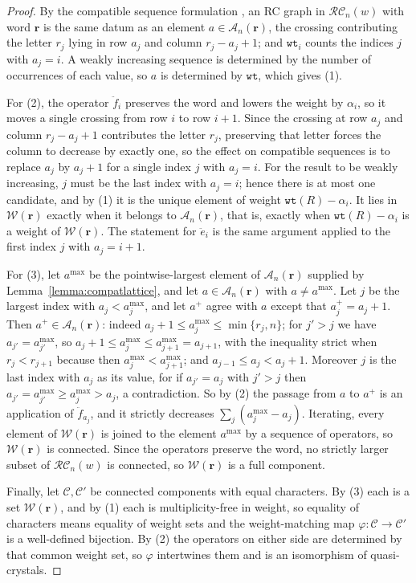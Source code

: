 \documentclass{amsart}
\theoremstyle{definition}
\theoremstyle{remark}
\numberwithin{equation}{subsection}
\newcommand{\wtt}{\mathtt{wt}}
\newcommand{\RC}{\mathcal{RC}}
\begin{document}
\begin{proof}
By the compatible sequence formulation \cite{bjs}, an RC graph in $\RC_n(w)$ with word $\mathbf{r}$ is the same datum as an element $a\in\mathcal{A}_n(\mathbf{r})$, the crossing contributing the letter $r_j$ lying in row $a_j$ and column $r_j-a_j+1$; and $\wtt_i$ counts the indices $j$ with $a_j=i$. A weakly increasing sequence is determined by the number of occurrences of each value, so $a$ is determined by $\wtt$, which gives (1).

For (2), the operator $\ddot{f}_i$ preserves the word and lowers the weight by $\alpha_i$, so it moves a single crossing from row $i$ to row $i+1$. Since the crossing at row $a_j$ and column $r_j-a_j+1$ contributes the letter $r_j$, preserving that letter forces the column to decrease by exactly one, so the effect on compatible sequences is to replace $a_j$ by $a_j+1$ for a single index $j$ with $a_j=i$. For the result to be weakly increasing, $j$ must be the last index with $a_j=i$; hence there is at most one candidate, and by (1) it is the unique element of weight $\wtt(R)-\alpha_i$. It lies in $\mathcal{W}(\mathbf{r})$ exactly when it belongs to $\mathcal{A}_n(\mathbf{r})$, that is, exactly when $\wtt(R)-\alpha_i$ is a weight of $\mathcal{W}(\mathbf{r})$. The statement for $\ddot{e}_i$ is the same argument applied to the first index $j$ with $a_j=i+1$.

For (3), let $a^{\max}$ be the pointwise-largest element of $\mathcal{A}_n(\mathbf{r})$ supplied by Lemma~\ref{lemma:compatlattice}, and let $a\in\mathcal{A}_n(\mathbf{r})$ with $a\neq a^{\max}$. Let $j$ be the largest index with $a_j<a^{\max}_j$, and let $a^+$ agree with $a$ except that $a^+_j=a_j+1$. Then $a^+\in\mathcal{A}_n(\mathbf{r})$: indeed $a_j+1\leq a^{\max}_j\leq\min\{r_j,n\}$; for $j'>j$ we have $a_{j'}=a^{\max}_{j'}$, so $a_j+1\leq a^{\max}_j\leq a^{\max}_{j+1}=a_{j+1}$, with the inequality strict when $r_j<r_{j+1}$ because then $a^{\max}_j<a^{\max}_{j+1}$; and $a_{j-1}\leq a_j<a_j+1$. Moreover $j$ is the last index with $a_j$ as its value, for if $a_{j'}=a_j$ with $j'>j$ then $a_{j'}=a^{\max}_{j'}\geq a^{\max}_j>a_j$, a contradiction. So by (2) the passage from $a$ to $a^+$ is an application of $\ddot{f}_{a_j}$, and it strictly decreases $\sum_{j}(a^{\max}_j-a_j)$. Iterating, every element of $\mathcal{W}(\mathbf{r})$ is joined to the element $a^{\max}$ by a sequence of operators, so $\mathcal{W}(\mathbf{r})$ is connected. Since the operators preserve the word, no strictly larger subset of $\RC_n(w)$ is connected, so $\mathcal{W}(\mathbf{r})$ is a full component.

Finally, let $\mathcal{C},\mathcal{C}'$ be connected components with equal characters. By (3) each is a set $\mathcal{W}(\mathbf{r})$, and by (1) each is multiplicity-free in weight, so equality of characters means equality of weight sets and the weight-matching map $\varphi:\mathcal{C}\to\mathcal{C}'$ is a well-defined bijection. By (2) the operators on either side are determined by that common weight set, so $\varphi$ intertwines them and is an isomorphism of quasi-crystals.
\end{proof}
\end{document}
